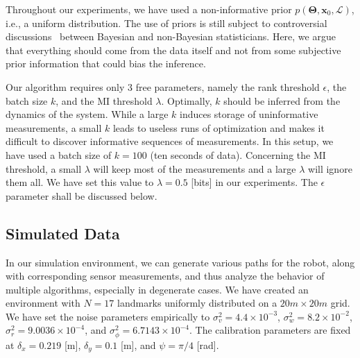 Throughout our experiments, we have used a non-informative prior
$p(\boldsymbol{\Theta}, \mathbf{x}_0, \mathcal{L})$, i.e., a uniform
distribution. The use of priors is still subject to controversial
discussions~\cite{gelman08objections} between Bayesian and non-Bayesian
statisticians. Here, we argue that everything should come from the data itself
and not from some subjective prior information that could bias the inference.

Our algorithm requires only 3 free parameters, namely the rank threshold
$\epsilon$, the batch size $k$, and the MI threshold $\lambda$. Optimally, $k$
should be inferred from the dynamics of the system. While a large $k$
induces storage of uninformative measurements, a small $k$ leads to useless
runs of optimization and makes it difficult to discover informative sequences 
of measurements. In this
setup, we have used a batch size of $k=100$ (ten seconds of data). Concerning
the MI threshold, a small $\lambda$ will keep most of the measurements and a
large $\lambda$ will ignore them all. We have set this value to
$\lambda=0.5$ [bits] in our experiments. The $\epsilon$ parameter shall be
discussed below.

\subsection{Simulated Data}

In our simulation environment, we can generate various paths for the robot,
along with corresponding sensor measurements, and thus analyze the behavior of
multiple algorithms, especially in degenerate cases. We have created an
environment with $N=17$ landmarks uniformly distributed on a $20m\times 20m$
grid. We have set the noise parameters empirically to
$\sigma^2_v=4.4\times 10^{-3}$, $\sigma^2_w=8.2\times 10^{-2}$,
$\sigma^2_r=9.0036\times 10^{-4}$, and $\sigma^2_\phi=6.7143\times 10^{-4}$. The
calibration parameters are fixed at $\delta_x=0.219$ [m], $\delta_y=0.1$ [m],
and $\psi=\pi/4$ [rad].

